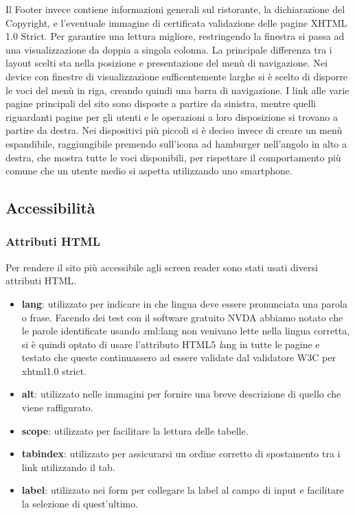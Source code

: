\documentclass{article}
\begin{document}
		    \bigbreak
		    Il Footer invece contiene informazioni generali sul ristorante, la dichiarazione del Copyright, e l'eventuale immagine di certificata validazione delle pagine XHTML 1.0 Strict. Per garantire una lettura migliore, restringendo la finestra si passa ad una visualizzazione da doppia a singola colonna.
		    \bigbreak
		    La principale differenza tra i layout scelti sta nella posizione e presentazione del menù di navigazione. 
		    \newline Nei device con finestre di visualizzazione sufficentemente larghe si è scelto di disporre le voci del menù in riga, creando quindi una barra di navigazione. I link alle varie pagine principali del sito sono disposte a partire da sinistra, mentre quelli riguardanti pagine per gli utenti e le operazioni a loro disposizione si trovano a partire da destra.
		    \newline Nei dispositivi più piccoli si è deciso invece di creare un menù espandibile, raggiungibile premendo sull'icona ad hamburger nell'angolo in alto a destra, che mostra tutte le voci disponibili, per rispettare il comportamento più comune che un utente medio si aspetta utilizzando uno smartphone.
		\subsection{Accessibilità}
			\subsubsection{Attributi HTML}
				Per rendere il sito più accessibile agli screen reader sono stati usati diversi attributi HTML.
					\begin{itemize}
						\item {\bfseries lang}: utilizzato per indicare in che lingua deve essere pronunciata una parola o frase. Facendo dei test con il software gratuito NVDA abbiamo notato che le parole identificate usando {\textit xml:lang} non venivano lette nella lingua corretta, si è quindi optato di usare l'attributo HTML5 {\textit lang} in tutte le pagine e testato che queste continuassero ad essere validate dal validatore W3C per xhtml1.0 strict.
						\item  {\bfseries alt}: utilizzato nelle immagini per fornire una breve descrizione di quello che viene raffigurato.
						\item {\bfseries scope}: utilizzato per facilitare la lettura delle tabelle.
						\item  {\bfseries tabindex}: utilizzato per assicurarsi un ordine corretto di spostamento tra i link utilizzando il tab.
						\item  {\bfseries label}: utilizzato nei form per collegare la label al campo di input e facilitare la selezione di quest'ultimo.
					\end{itemize}
\end{document}
